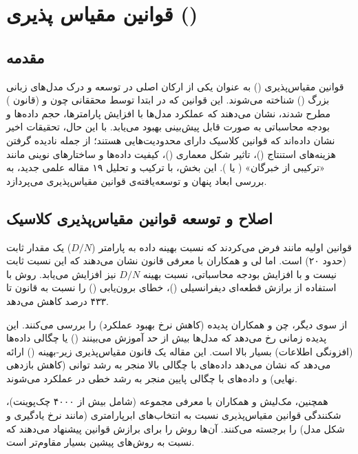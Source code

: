 \section{قوانین مقیاس پذیری ()}

\subsection{مقدمه}
قوانین مقیاس‌پذیری () به عنوان یکی از ارکان اصلی در توسعه و درک مدل‌های زبانی بزرگ () شناخته می‌شوند. این قوانین که در ابتدا توسط محققانی چون  و  (قانون ) مطرح شدند، نشان می‌دهند که عملکرد مدل‌ها با افزایش پارامترها، حجم داده‌ها و بودجه محاسباتی به صورت قابل پیش‌بینی بهبود می‌یابد. با این حال، تحقیقات اخیر نشان داده‌اند که قوانین کلاسیک دارای محدودیت‌هایی هستند؛ از جمله نادیده گرفتن هزینه‌های استنتاج ()، تاثیر شکل معماری ()، کیفیت داده‌ها و ساختارهای نوینی مانند «ترکیبی از خبرگان» ( یا ). این بخش، با ترکیب و تحلیل ۱۹ مقاله علمی جدید، به بررسی ابعاد پنهان و توسعه‌یافته‌ی قوانین مقیاس‌پذیری می‌پردازد.

\subsection{اصلاح و توسعه قوانین مقیاس‌پذیری کلاسیک}
قوانین اولیه مانند  فرض می‌کردند که نسبت بهینه داده به پارامتر ($D/N$) یک مقدار ثابت (حدود ۲۰) است. اما لی و همکاران \cite{li2025farseer} با معرفی قانون  نشان می‌دهند که این نسبت ثابت نیست و با افزایش بودجه محاسباتی، نسبت بهینه $D/N$ نیز افزایش می‌یابد. روش  با استفاده از برازش قطعه‌ای دیفرانسیلی ()، خطای برون‌یابی () را نسبت به قانون  تا ۴۳۳ درصد کاهش می‌دهد.

از سوی دیگر، چن و همکاران \cite{chen2025revisiting} پدیده  (کاهش نرخ بهبود عملکرد) را بررسی می‌کنند. این پدیده زمانی رخ می‌دهد که مدل‌ها بیش از حد آموزش می‌بینند () یا چگالی داده‌ها (افزونگی اطلاعات) بسیار بالا است. این مقاله یک قانون مقیاس‌پذیری زیر-بهینه () ارائه می‌دهد که نشان می‌دهد داده‌های با چگالی بالا منجر به رشد توانی (کاهش بازدهی نهایی) و داده‌های با چگالی پایین منجر به رشد خطی در عملکرد می‌شوند.

همچنین، مک‌لیش و همکاران \cite{mcleish2025gemstones} با معرفی مجموعه  (شامل بیش از ۴۰۰۰ چک‌پوینت)، شکنندگی قوانین مقیاس‌پذیری نسبت به انتخاب‌های ابرپارامتری (مانند نرخ یادگیری و شکل مدل) را برجسته می‌کنند. آن‌ها روش  را برای برازش قوانین پیشنهاد می‌دهند که نسبت به روش‌های پیشین بسیار مقاوم‌تر است.

